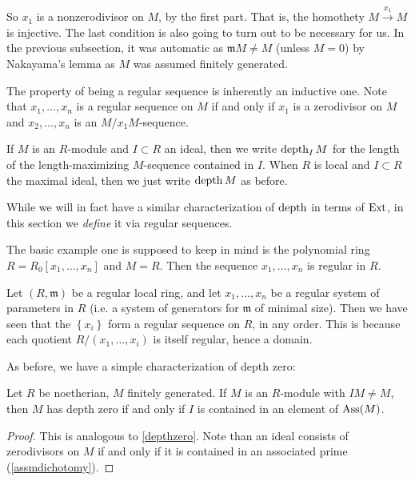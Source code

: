 So $x_1$ is a nonzerodivisor on $M$, by the first part. That is, the homothety
$M \stackrel{x_1}{\to} M$ is injective. 
The last condition is also going to turn out to be necessary for us. In the
previous subsection, it was automatic as $\mathfrak{m}M \neq M$ (unless $M =
0$) by Nakayama's lemma as $M$ was assumed finitely generated.	


The property of being a regular sequence is inherently an inductive one. Note
that $x_1, \dots, x_n$ is a regular sequence on $M$ if and only if $x_1$ is a
zerodivisor on $M$ and $x_2, \dots, x_n$ is an $M/x_1 M$-sequence.


\begin{definition} 
If $M$ is an $R$-module and $I \subset R$ an ideal, then we write $\operatorname{depth}_I M$
for the length of the length-maximizing $M$-sequence contained in $I$.
When $R$ is local and $I \subset R$ the maximal ideal, then we just write
$\operatorname{depth} M$ as before.
\end{definition} 

While we will in fact have a similar characterization of $\operatorname{depth}$ in terms of
$\operatorname{Ext}$, in this section we \emph{define} it via regular sequences.

\begin{example} 
The basic example one is supposed to keep in mind is the polynomial ring $R =
R_0[x_1, \dots, x_n]$ and $M = R$. Then the sequence $x_1, \dots, x_n$ is
regular in $R$.
\end{example} 

\begin{example} 
Let $(R, \mathfrak{m})$ be a regular local ring, and let $x_1, \dots, x_n$ be a
regular system of parameters in $R$ (i.e. a system of generators for
$\mathfrak{m}$ of minimal size). Then we have seen that the
$\left\{x_i\right\}$ form a regular sequence on $R$, in any order. This is
because each quotient $R/(x_1, \dots, x_i)$ is itself regular, hence a domain.
\end{example} 

As before, we have a simple characterization of depth zero:
\begin{proposition} Let $R$ be noetherian, $M$ finitely generated.
If $M$ is an $R$-module with $IM \neq M$, then $M$ has depth zero if and only
if $I $ is contained in an element of $\operatorname{Ass}(M)$.
\end{proposition} 
\begin{proof} 
This is analogous to \cref{depthzero}. Note than an ideal consists of
zerodivisors on $M$ if and only if it is contained in an associated prime
(\cref{assmdichotomy}).
\end{proof} 

